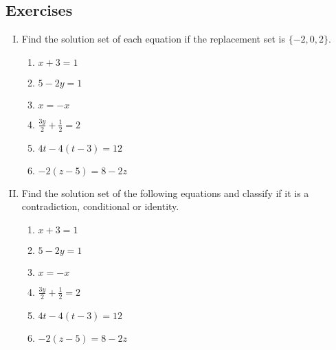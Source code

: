 \subsection*{Exercises}
\begin{enumerate}[I.]
\item Find the solution set of each equation if the replacement set is $\{-2, 0, 2\}$.
	\begin{enumerate}[1.]
	\item $x+3=1$
	\item $5-2y=1$
	\item $x=-x$
	\item $\frac{3y}{2}+\frac{1}{2}=2$
	\item $4t-4(t-3) = 12$
	\item $-2(z-5) = 8-2z$
	\end{enumerate}

\item Find the solution set of the following equations and classify if it is a contradiction, conditional or identity.
	\begin{enumerate}[1.]
	\item $x+3=1$
	\item $5-2y=1$
	\item $x=-x$
	\item $\frac{3y}{2}+\frac{1}{2}=2$
	\item $4t-4(t-3) = 12$
	\item $-2(z-5) = 8-2z$
	\end{enumerate}


\end{enumerate}
